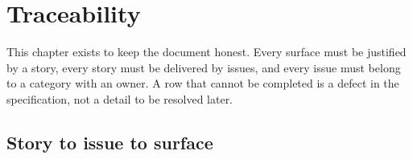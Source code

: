 \appendix

\chapter{Traceability}
\label{ch:traceability}

This chapter exists to keep the document honest. Every surface must be justified by a story,
every story must be delivered by issues, and every issue must belong to a category with an
owner. A row that cannot be completed is a defect in the specification, not a detail to be
resolved later.

\section{Story to issue to surface}

